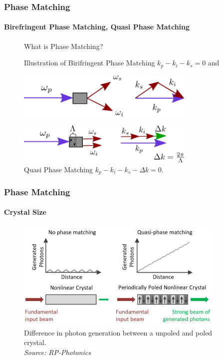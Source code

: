 \documentclass[serif,8pt]{beamer}
\begin{document}
\begin{frame}
	\frametitle{Phase Matching}
	\framesubtitle{Birefringent Phase Matching, Quasi Phase Matching}
\begin{figure}
	What is Phase Matching?
		\begin{center}
		\caption{Illustration of Birifringent Phase Matching $k_p - k_i - k_s = 0$ and}
		  \includegraphics[width=8.5cm]{SPDCkPM.png}\\
		\caption{Quasi Phase Matching $k_p - k_i -k_s - \Delta k = 0$.}
		  \includegraphics[width=8.5cm]{SPDCkQPM.png}
		\end{center}
		\label{fig:SPDCk}
	\end{figure}
\end{frame}


\begin{frame}[t]
	\frametitle{Phase Matching}
	\framesubtitle{Crystal Size}
	\begin{figure}
		\caption{Difference in photon generation between a unpoled and poled crystal.\\\textit{Source: RP-Photonics}}
		\begin{center}
			\includegraphics[width=10cm]{PolledVsNot.png}
		\end{center}
		\label{fig:poledvsnot}
	\end{figure}
\end{frame}
\end{document}

